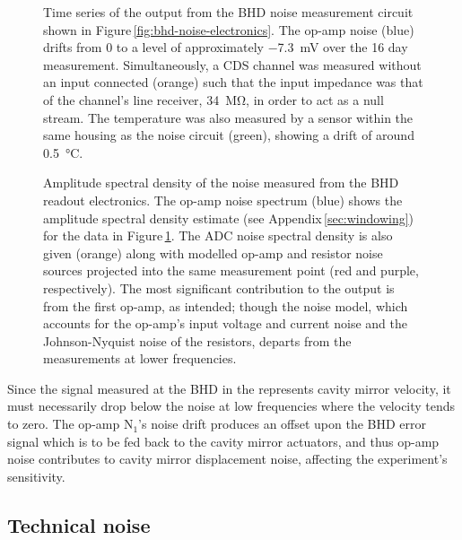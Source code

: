 \begin{figure}
  \centering
  
  \caption[Time series of the noise measured from the balanced homodyne readout electronics]{\label{fig:op-amp-noise-time-series}Time series of the output from the BHD noise measurement circuit shown in Figure\,\ref{fig:bhd-noise-electronics}. The op-amp noise (blue) drifts from \num{0} to a level of approximately \SI{-7.3}{\milli\volt} over the 16 day measurement. Simultaneously, a \gls{CDS} channel was measured without an input connected (orange) such that the input impedance was that of the channel's line receiver, \SI{34}{\mega\ohm}, in order to act as a null stream. The temperature was also measured by a sensor within the same housing as the noise circuit (green), showing a drift of around \SI{0.5}{\celsius}.}
\end{figure}

\begin{figure}
  \centering
  
  \caption[Amplitude spectral density of the noise measured from the balanced homodyne readout electronics]{\label{fig:op-amp-noise-spectrum}Amplitude spectral density of the noise measured from the \gls{BHD} readout electronics. The op-amp noise spectrum (blue) shows the amplitude spectral density estimate (see Appendix\,\ref{sec:windowing}) for the data in Figure\,\ref{fig:op-amp-noise-time-series}. The \gls{ADC} noise spectral density is also given (orange) along with modelled op-amp and resistor noise sources projected into the same measurement point (red and purple, respectively). The most significant contribution to the output is from the first op-amp, as intended; though the noise model, which accounts for the op-amp's input voltage and current noise and the Johnson-Nyquist noise of the resistors, departs from the measurements at lower frequencies.}
\end{figure}

Since the signal measured at the \gls{BHD} in the \SSMEXPT{} represents cavity mirror velocity, it must necessarily drop below the noise at low frequencies where the velocity tends to zero. The op-amp $\textrm{N}_{1}$'s noise drift produces an offset upon the \gls{BHD} error signal which is to be fed back to the cavity mirror actuators, and thus op-amp noise contributes to cavity mirror displacement noise, affecting the experiment's sensitivity.

\subsection{Technical noise}

